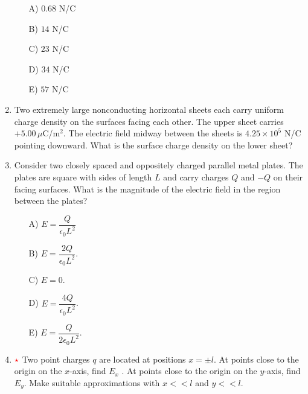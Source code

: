 \begin{enumerate}
    \begin{multicols}{5}
    \begin{itemize}
        \item[A)] $0.68$ N/C
        \item[B)] $14$ N/C
        \item[C)] $23$ N/C
        \item[D)] $34$ N/C
        \item[E)] $57$ N/C
    \end{itemize}
    \end{multicols}


    \item Two extremely large nonconducting horizontal sheets each carry uniform charge density on the surfaces facing each other. The upper sheet carries $+5.00\,\mu$C/m$^2$. The electric field midway between the sheets is $4.25\times10^5$ N/C pointing downward. What is the surface charge density on the lower sheet?


    \item Consider two closely spaced and oppositely charged parallel metal plates. The plates are square with sides of length $L$ and carry charges $Q$ and $-Q$ on their facing surfaces. What is the magnitude of the electric field in the region between the plates?

\begin{multicols}{5}
    \begin{itemize}
        \item[A)] $E = \dfrac{Q}{\epsilon_0L^2}$
        \item[B)] $E = \dfrac{2Q}{\epsilon_0L^2}$.
        \item[C)] $E=0$.
        \item[D)] $E = \dfrac{4Q}{\epsilon_0L^2}$.
        \item[E)] $E = \dfrac{Q}{2\epsilon_0L^2}$.
    \end{itemize}
\end{multicols}


\item $\color{red}{\star}$ Two point charges $q$ are located at positions $x = \pm l$. At points
close to the origin on the $x$-axis, find $E_x$ . At points close to the
origin on the $y$-axis, find $E_y$. Make suitable approximations
with $x<<l$ and $y<<l$.


\end{enumerate}
